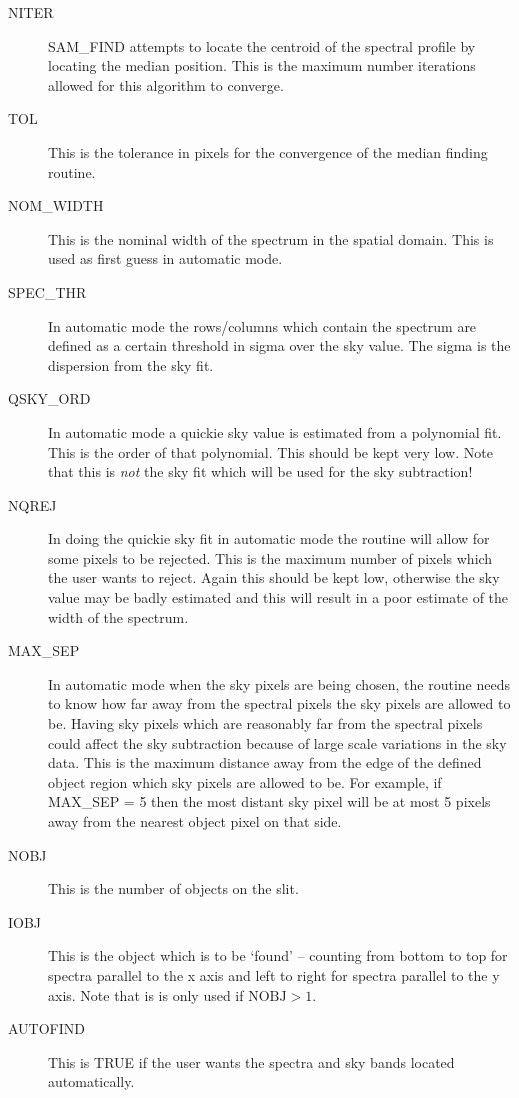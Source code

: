 \begin{description}

\item[NITER] SAM\_FIND attempts to locate the centroid of the spectral profile
by locating the median position.  This is the maximum number iterations
allowed for this algorithm to converge.

\item[TOL] This is the tolerance in pixels for the convergence of the median
finding routine.

\item[NOM\_WIDTH] This is the nominal width of the spectrum in the spatial
domain.  This is used as first guess in automatic mode.

\item[SPEC\_THR] In automatic mode the rows/columns which contain the spectrum
are defined as a certain threshold in sigma over the sky value.  The sigma is
the dispersion from the sky fit.

\item[QSKY\_ORD] In automatic mode a quickie sky value is estimated from a
polynomial fit.  This is the order of that polynomial.  This should be kept
very low.  Note that this is {\em not} the sky fit which will be used for the
sky subtraction!

\item[NQREJ] In doing the quickie sky fit in automatic mode the routine will
allow for some pixels to be rejected.  This is the maximum number of pixels
which the user wants to reject.  Again this should be kept low, otherwise the
sky value may be badly estimated and this will result in a poor estimate of
the width of the spectrum.

\item[MAX\_SEP]  In automatic mode when the sky pixels are being chosen, the
routine needs to know how far away from the spectral pixels the sky pixels are
allowed to be.  Having sky pixels which are reasonably far from the spectral
pixels could affect the sky subtraction because of large scale variations in
the sky data.  This is the maximum distance away from the edge of the defined
object region which sky pixels are allowed to be. For example, if MAX\_SEP = 5
then the most distant sky pixel will be at most 5 pixels away from the nearest
object pixel on that side.

\item[NOBJ] This is the number of objects on the slit.

\item[IOBJ] This is the object which is to be `found' -- counting from bottom
to top for spectra parallel to the x axis and left to right for spectra
parallel to the y axis.  Note that is is only used if $\mbox{NOBJ} > 1$.

\item[AUTOFIND] This is TRUE if the user wants the spectra and sky bands
located automatically.

\end{description}

